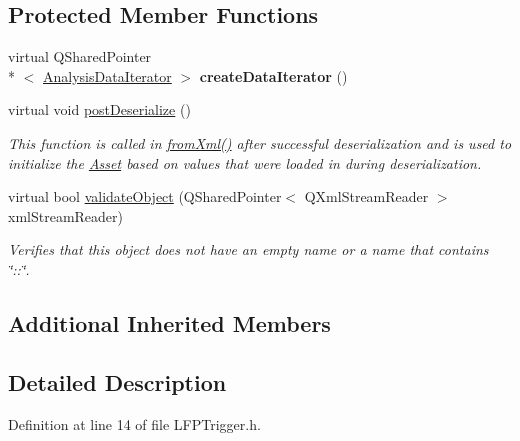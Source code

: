 \subsection*{Protected Member Functions}
\begin{DoxyCompactItemize}
\item 
\hypertarget{class_picto_1_1_l_f_p_trigger_aad01b9d9438b4aca6e4a4053093bbb05}{virtual Q\-Shared\-Pointer\\*
$<$ \hyperlink{class_picto_1_1_analysis_data_iterator}{Analysis\-Data\-Iterator} $>$ {\bfseries create\-Data\-Iterator} ()}\label{class_picto_1_1_l_f_p_trigger_aad01b9d9438b4aca6e4a4053093bbb05}

\item 
virtual void \hyperlink{class_picto_1_1_l_f_p_trigger_ad7b53e79688098d11d0de78abeed679b}{post\-Deserialize} ()
\begin{DoxyCompactList}\small\item\em This function is called in \hyperlink{class_picto_1_1_asset_a8bed4da09ecb1c07ce0dab313a9aba67}{from\-Xml()} after successful deserialization and is used to initialize the \hyperlink{class_picto_1_1_asset}{Asset} based on values that were loaded in during deserialization. \end{DoxyCompactList}\item 
\hypertarget{class_picto_1_1_l_f_p_trigger_a025cb963d3f768be72e9f77120e0d7c1}{virtual bool \hyperlink{class_picto_1_1_l_f_p_trigger_a025cb963d3f768be72e9f77120e0d7c1}{validate\-Object} (Q\-Shared\-Pointer$<$ Q\-Xml\-Stream\-Reader $>$ xml\-Stream\-Reader)}\label{class_picto_1_1_l_f_p_trigger_a025cb963d3f768be72e9f77120e0d7c1}

\begin{DoxyCompactList}\small\item\em Verifies that this object does not have an empty name or a name that contains \char`\"{}\-::\char`\"{}. \end{DoxyCompactList}\end{DoxyCompactItemize}
\subsection*{Additional Inherited Members}


\subsection{Detailed Description}


Definition at line 14 of file L\-F\-P\-Trigger.\-h.



